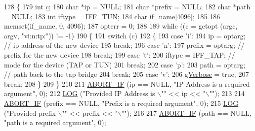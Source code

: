 \begin{DoxyCode}
178 \{
179   \textcolor{keywordtype}{int} \hyperlink{lte_2model_2fading-traces_2fading__trace__generator_8m_ae0323a9039add2978bf5b49550572c7c}{c};
180   \textcolor{keywordtype}{char} *ip = NULL;
181   \textcolor{keywordtype}{char} *prefix = NULL;
182   \textcolor{keywordtype}{char} *path = NULL;
183   \textcolor{keywordtype}{int} iftype = IFF\_TUN;
184   \textcolor{keywordtype}{char} if\_name[4096];
185 
186   memset(if\_name, 0, 4096);
187   opterr = 0;
188 
189   \textcolor{keywordflow}{while} ((c = getopt (argc, argv, \textcolor{stringliteral}{"vi:n:tp:"})) != -1)
190     \{
191       \textcolor{keywordflow}{switch} (c)
192         \{
193         \textcolor{keywordflow}{case} \textcolor{charliteral}{'i'}:
194           ip = optarg;            \textcolor{comment}{// ip address of the new device}
195           \textcolor{keywordflow}{break};
196         \textcolor{keywordflow}{case} \textcolor{charliteral}{'n'}:
197           prefix = optarg;        \textcolor{comment}{// prefix for the new device}
198           \textcolor{keywordflow}{break};
199         \textcolor{keywordflow}{case} \textcolor{charliteral}{'t'}:
200           iftype = IFF\_TAP;       \textcolor{comment}{// mode for the device (TAP or TUN)}
201           \textcolor{keywordflow}{break};
202         \textcolor{keywordflow}{case} \textcolor{charliteral}{'p'}:
203           path = optarg;          \textcolor{comment}{// path back to the tap bridge}
204           \textcolor{keywordflow}{break};
205         \textcolor{keywordflow}{case} \textcolor{charliteral}{'v'}:
206           \hyperlink{tap-creator_8cc_a80b7a0563409f3e21c80e0459c85845e}{gVerbose} = \textcolor{keyword}{true};
207           \textcolor{keywordflow}{break};
208         \}
209     \}
210 
211   \hyperlink{creator-utils_8h_a91c11c90ad2f1672fbd3c031038dce16}{ABORT\_IF} (ip == NULL, \textcolor{stringliteral}{"IP Address is a required argument"}, 0);
212   \hyperlink{creator-utils_8h_a158a8c64f24645c7478298399825737f}{LOG} (\textcolor{stringliteral}{"Provided IP Address is \(\backslash\)""} << ip << \textcolor{stringliteral}{"\(\backslash\)""});
213 
214   \hyperlink{creator-utils_8h_a91c11c90ad2f1672fbd3c031038dce16}{ABORT\_IF} (prefix == NULL, \textcolor{stringliteral}{"Prefix is a required argument"}, 0);
215   \hyperlink{creator-utils_8h_a158a8c64f24645c7478298399825737f}{LOG} (\textcolor{stringliteral}{"Provided prefix \(\backslash\)""} << prefix << \textcolor{stringliteral}{"\(\backslash\)""});
216 
217   \hyperlink{creator-utils_8h_a91c11c90ad2f1672fbd3c031038dce16}{ABORT\_IF} (path == NULL, \textcolor{stringliteral}{"path is a required argument"}, 0);

\end{DoxyCode}
